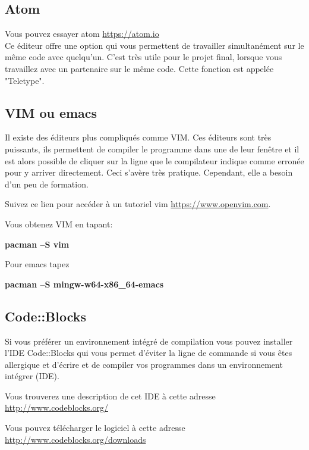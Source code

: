 \documentclass{article}
\begin{document}
\subsection{Atom\label{S:VisCodAtom}}
Vous pouvez essayer atom \href{https://atom.io}{https://atom.io}\\

Ce éditeur offre une option qui vous permettent de travailler simultanément sur le même code avec quelqu'un. C'est très utile pour le projet final, lorsque vous travaillez avec un partenaire sur le même code. Cette fonction est appelée "Teletype".
\subsection{VIM ou emacs}
Il existe des éditeurs plus compliqués comme VIM. Ces éditeurs sont très puissants, ils permettent de compiler le programme dans une de leur fenêtre et il est alors possible de cliquer sur la ligne que le compilateur indique comme erronée pour y arriver directement. Ceci s’avère très pratique. Cependant, elle a besoin d'un peu de formation.

Suivez ce lien pour accéder à un tutoriel vim \href{https://www.openvim.com}{https://www.openvim.com}.

Vous obtenez VIM en tapant: 
\begin{tcolorbox}[width=\textwidth,colframe=Purple,colback={black},title={Ceci est la console MSYS2 Shell},outer arc=0mm,colupper=white]    
      \large\textbf{pacman –S vim}
\end{tcolorbox}
Pour emacs tapez 
\begin{tcolorbox}[width=\textwidth,colframe=Purple,colback={black},title={Ceci est la console MSYS2 Shell},outer arc=0mm,colupper=white]    
      \large\textbf{pacman –S mingw-w64-x86\_64-emacs}
\end{tcolorbox}

\subsection{Code::Blocks}
Si vous préférer un environnement intégré de compilation vous pouvez installer l'IDE Code::Blocks qui vous permet d'éviter la ligne de commande si vous êtes allergique et d'écrire et de compiler vos programmes dans un environnement intégrer (IDE).

Vous trouverez une description de cet IDE à cette adresse \href{http://www.codeblocks.org/}{http://www.codeblocks.org/}

Vous pouvez télécharger le logiciel à cette adresse \href{http://www.codeblocks.org/downloads}{http://www.codeblocks.org/downloads}
\end{document}
